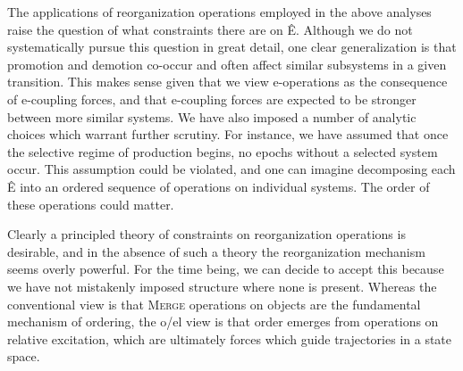   The applications of reorganization operations employed in the above analyses raise the question of what constraints there are on Ê. Although we do not systematically pursue this question in great detail, one clear generalization is that promotion and demotion co-occur and often affect similar subsystems in a given transition. This makes sense given that we view e-operations as the consequence of e-coupling forces, and that e-coupling forces are expected to be stronger between more similar systems. We have also imposed a number of analytic choices which warrant further scrutiny. For instance, we have assumed that once the selective regime of production begins, no epochs without a selected system occur. This assumption could be violated, and one can imagine decomposing each Ê into an ordered sequence of operations on individual systems. The order of these operations could matter.

  Clearly a principled theory of constraints on reorganization operations is desirable, and in the absence of such a theory the reorganization mechanism seems overly powerful. For the time being, we can decide to accept this because we have not mistakenly imposed structure where none is present. Whereas the conventional view is that \textsc{Merge} operations on objects are the fundamental mechanism of ordering, the o/el view is that order emerges from operations on relative excitation, which are ultimately forces which guide trajectories in a state space.

